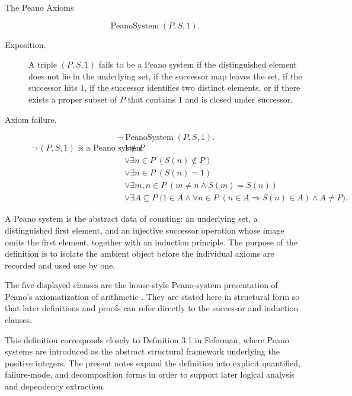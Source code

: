 \begin{topicbox}{The Peano Axioms}
\begin{remark*}
\[
\operatorname{PeanoSystem}(P,S,1).
\]
\end{remark*}

\begin{remark*}
\begin{description}
  \item[Exposition.]
  A triple $(P,S,1)$ fails to be a Peano system if the distinguished element
  does not lie in the underlying set, if the successor map leaves the set, if
  the successor hits $1$, if the successor identifies two distinct elements,
  or if there exists a proper subset of $P$ that contains $1$ and is closed
  under successor.
  \item[Axiom failure.]
  \[
  \neg\operatorname{PeanoSystem}(P,S,1).
  \]
  \[
  \begin{aligned}
  \neg\,\text{$(P,S,1)$ is a Peano system}
  \Longrightarrow\;&
  1 \notin P \\
  &\lor \exists n \in P\;(S(n) \notin P) \\
  &\lor \exists n \in P\;(S(n)=1) \\
  &\lor \exists m,n \in P\;(m \neq n \land S(m)=S(n)) \\
  &\lor \exists A \subseteq P\;
  \bigl(1 \in A \land
  \forall n \in P\;(n \in A \Longrightarrow S(n) \in A)
  \land A \neq P\bigr).
  \end{aligned}
  \]
\end{description}
\end{remark*}

\begin{remark*}[Interpretation]
A Peano system is the abstract data of counting: an underlying set, a
distinguished first element, and an injective successor operation whose image
omits the first element, together with an induction principle. The purpose of
the definition is to isolate the ambient object before the individual axioms
are recorded and used one by one.


The five displayed clauses are the house-style Peano-system presentation of
Peano's axiomatization of arithmetic \citep{PeanoArithmeticesPrincipia1889}.
They are stated here in structural form so that later definitions and proofs
can refer directly to the successor and induction clauses.
\end{remark*}

\begin{remark*}
This definition corresponds closely to Definition 3.1 in
Feferman, where Peano systems are introduced as the abstract structural
framework underlying the positive integers. The present notes expand the
definition into explicit quantified, failure-mode, and decomposition forms in
order to support later logical analysis and dependency extraction.
\citet{FefermanNumberSystems1964}
\end{remark*}


\end{topicbox}

